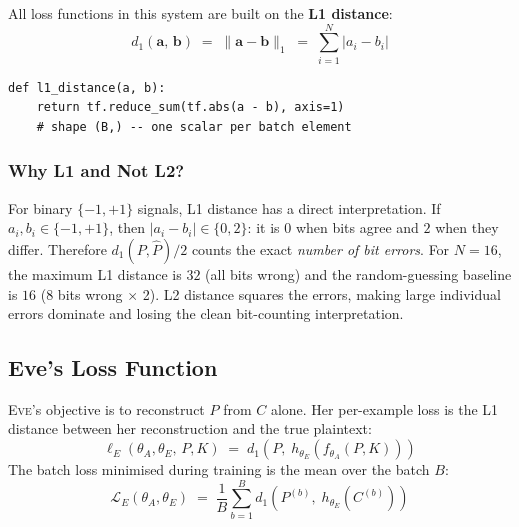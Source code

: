 \documentclass[12pt, a4paper]{article}
\newcommand{\eve}{\textsc{Eve}}
\newcommand{\thetaA}{\theta_{\!A}}
\newcommand{\thetaE}{\theta_{\!E}}
\begin{document}
All loss functions in this system are built on the \textbf{L1 distance}:
%
\begin{equation}
  d_1(\mathbf{a},\, \mathbf{b})
  \;=\; \|\mathbf{a} - \mathbf{b}\|_1
  \;=\; \sum_{i=1}^{N} |a_i - b_i|
  \label{eq:l1_full}
\end{equation}

\begin{lstlisting}[caption={L1 distance implementation}]
def l1_distance(a, b):
    return tf.reduce_sum(tf.abs(a - b), axis=1)
    # shape (B,) -- one scalar per batch element
\end{lstlisting}

\subsubsection*{Why L1 and Not L2?}

For binary $\{-1,+1\}$ signals, L1 distance has a direct interpretation.
If $a_i, b_i \in \{-1,+1\}$, then $|a_i - b_i| \in \{0, 2\}$: it is $0$
when bits agree and $2$ when they differ. Therefore $d_1(P, \hat{P})/2$
counts the exact \emph{number of bit errors}. For $N=16$, the maximum L1
distance is $32$ (all bits wrong) and the random-guessing baseline is $16$
(8 bits wrong $\times$ 2). L2 distance squares the errors, making large
individual errors dominate and losing the clean bit-counting interpretation.

\subsection{Eve's Loss Function}
\label{subsec:eve_loss}

\eve{}'s objective is to reconstruct $P$ from $C$ alone. Her per-example
loss is the L1 distance between her reconstruction and the true plaintext:
%
\begin{equation}
  \ell_E(\thetaA, \thetaE,\, P, K)
  \;=\; d_1\!\left(P,\; h_{\thetaE}\!\left(f_{\thetaA}(P,K)\right)\right)
  \label{eq:eve_loss_formal}
\end{equation}
%
The batch loss minimised during training is the mean over the batch $B$:
%
\begin{equation}
  \mathcal{L}_E(\thetaA, \thetaE)
  \;=\; \frac{1}{B} \sum_{b=1}^{B}
        d_1\!\left(P^{(b)},\; h_{\thetaE}\!\left(C^{(b)}\right)\right)
  \label{eq:eve_loss_batch}
\end{equation}
\end{document}
